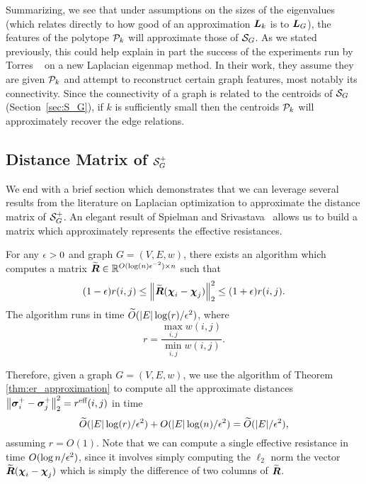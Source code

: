 Summarizing, we see  that under assumptions on the sizes of the eigenvalues (which relates  directly to  how good of an approximation $\L_k$ is to $\L_G$), the features of the  polytope $\P_k$  will  approximate  those of $\splx_G$. As we stated previously, this could help explain in part the success of the experiments run by Torres \etal~\cite{torres2019geometric} on  a new Laplacian eigenmap method.  In their work, they assume they are given  $\P_k$ and  attempt to reconstruct certain  graph  features,  most notably its connectivity.  Since  the connectivity of  a  graph  is related to  the centroids of $\splx_G$ (Section~\ref{sec:S_G}), if $k$ is sufficiently small then  the centroids $\P_k$ will approximately  recover the edge relations. 




\subsection{Distance Matrix of \texorpdfstring{$\splx_G^+$}{the inverse combinatorial simplex}}
\label{sec:algorithmics_distance_matrix}
We end with  a brief section which demonstrates that we can leverage several results from the literature on Laplacian optimization to approximate the  distance matrix  of $\splx_G^+$. 
An elegant result of Spielman and Srivastava~\cite{spielman2011graph} allows us to  build a matrix which approximately  represents the effective resistances.  


\begin{theorem}
	\label{thm:er_approximation}
	For any $\eps>0$ and graph $G=(V,E,w)$, there exists an algorithm which computes a matrix $\widetilde{\Reff}\in\R^{O(\log(n)\eps^{-2})\times n}$ such that 
	\begin{equation*}
	(1-\eps)r(i,j) \leq \norm{\widetilde{\Reff}(\bchi_i-\bchi_j)}_2^2 \leq (1+\eps) r(i,j).
	\end{equation*}
	The algorithm runs in time $\widetilde{O}( |E|\log (r)/\eps^2)$, where 
	\[r=\frac{\max_{i,j}w(i,j)}{\min_{i,j}w(i,j)}.\]
\end{theorem}


Therefore, given a graph $G=(V,E,w)$, we use the algorithm of Theorem \ref{thm:er_approximation} to compute all the approximate distances $\norm{\sv_i^+-\sv_j^+}_2^2=\effr(i,j)$ in time \[\widetilde{O}(|E|\log (r)/\eps^2)+O(|E| \log(n)/\eps^2)=\widetilde{O}(|E|/\eps^2),\]
assuming $r=O(1)$. Note that we can compute a single effective resistance in time $O(\log n/\eps^2)$, since it involves simply computing the $\ell_2$ norm the vector $\widetilde{\Reff}(\bchi_i-\bchi_j)$ which is simply the difference of two columns of $\widetilde{\Reff}$. 


